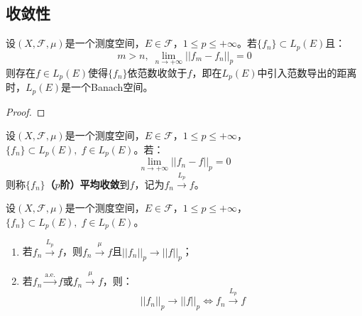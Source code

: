 \subsection{收敛性}
\begin{theorem}\label{theo:LpBanach}
	设$(X,\mathscr{F},\mu)$是一个测度空间，$E\in\mathscr{F}$，$1\leqslant p\leqslant+\infty$。若$\{f_n\}\subset L_p(E)$且：
	\begin{equation*}
		m>n,\;\lim_{n\to+\infty}||f_m-f_n||_p=0
	\end{equation*}
	则存在$f\in L_p(E)$使得$\{f_n\}$依范数收敛于$f$，即在$L_p(E)$中引入范数导出的距离时，$L_p(E)$是一个Banach空间。
\end{theorem}
\begin{proof}
	
\end{proof}
\begin{definition}
	设$(X,\mathscr{F},\mu)$是一个测度空间，$E\in\mathscr{F}$，$1\leqslant p\leqslant+\infty$，$\{f_n\}\subset L_p(E),\;f\in L_p(E)$。若：
	\begin{equation*}
		\lim_{n\to+\infty}||f_n-f||_p=0
	\end{equation*}
	则称$\{f_n\}$\textbf{（$p$阶）平均收敛}到$f$，记为$f_n\overset{L_p}{\longrightarrow}f$。
\end{definition}
\begin{theorem}
	设$(X,\mathscr{F},\mu)$是一个测度空间，$E\in\mathscr{F}$，$1\leqslant p\leqslant+\infty$，$\{f_n\}\subset L_p(E),\;f\in L_p(E)$。
	\begin{enumerate}
		\item 若$f_n\overset{L_p}{\longrightarrow}f$，则$f_n\overset{\mu}{\longrightarrow}f$且$||f_n||_p\to||f||_p$；
		\item 若$f_n\overset{\text{a.e.}}{\longrightarrow}f$或$f_n\overset{\mu}{\longrightarrow}f$，则：
		\begin{equation*}
			||f_n||_p\to||f||_p\Leftrightarrow f_n\overset{L_p}{\longrightarrow}f
		\end{equation*}
	\end{enumerate}
\end{theorem}
